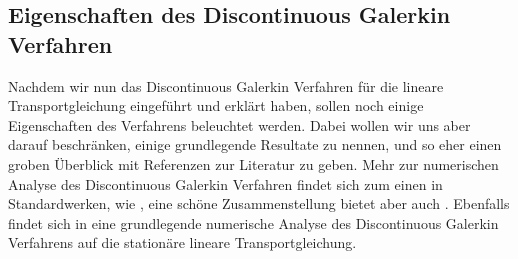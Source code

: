\subsection{Eigenschaften des Discontinuous Galerkin Verfahren}
Nachdem wir nun das Discontinuous Galerkin Verfahren für die lineare Transportgleichung eingeführt und erklärt haben, sollen noch einige Eigenschaften des Verfahrens beleuchtet werden. Dabei wollen wir uns aber darauf beschränken, einige grundlegende Resultate zu nennen, und so eher einen groben Überblick mit Referenzen zur Literatur zu geben. Mehr zur numerischen Analyse des Discontinuous Galerkin Verfahren findet sich zum einen in Standardwerken, wie \cite{ern2004theory}, eine schöne Zusammenstellung bietet aber auch \cite{Har08b}.
Ebenfalls findet sich in \cite{Har08b} eine grundlegende numerische Analyse des Discontinuous Galerkin Verfahrens auf die stationäre lineare Transportgleichung.
